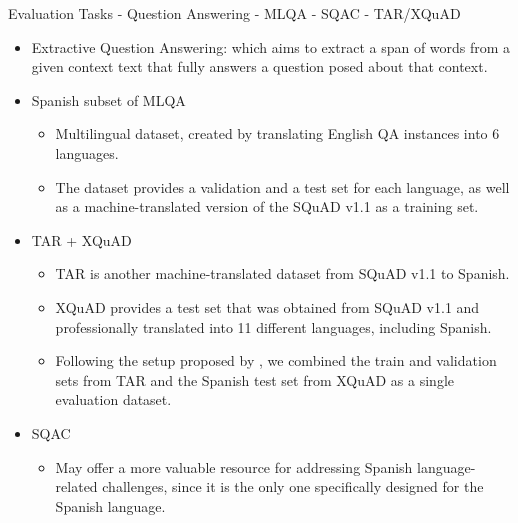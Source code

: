 \documentclass[aspectratio=169,xcolor=dvipsnames]{beamer}
\begin{document}
\begin{frame}{Evaluation Tasks - Question Answering - MLQA - SQAC - TAR/XQuAD}

\begin{itemize}
    \item Extractive Question Answering: which aims to extract a span of words from a given context text that fully answers a question posed about that context.
    \item Spanish subset of MLQA \citep{lewis-etal-2020-mlqa}
    \begin{itemize}
        \item Multilingual dataset, created by translating English QA instances into 6 languages.
        \item The dataset provides a validation and a test set for each language, as well as a machine-translated version of the SQuAD v1.1 \citep{rajpurkar-etal-2016-squad} as a training set.
    \end{itemize}
    \item TAR \citep{carrino-etal-2020-automatic} + XQuAD \citep{artetxe-etal-2020-cross}
    \begin{itemize}
        \item TAR \citep{carrino-etal-2020-automatic} is another machine-translated dataset from SQuAD v1.1 to Spanish.
        \item XQuAD \citep{artetxe-etal-2020-cross} provides a test set that was obtained from SQuAD v1.1 and professionally translated into 11 different languages, including Spanish.
        \item Following the setup proposed by \citep{CaneteCFP2020}, we combined the train and validation sets from TAR and the Spanish test set from XQuAD as a single evaluation dataset.
    \end{itemize}
    \item SQAC \citep{gutierrezfandino2022-roberta-bne}
    \begin{itemize}
        \item May offer a more valuable resource for addressing Spanish language-related challenges, since it is the only one specifically designed for the Spanish language.
    \end{itemize}
\end{itemize}

\end{frame}
\end{document}
